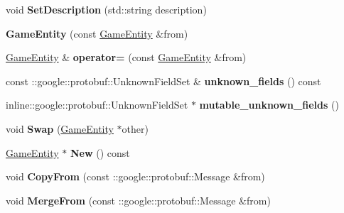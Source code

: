 \begin{DoxyCompactItemize}
\item 
\hypertarget{class_game_entity_a163f5785614921a65aab161491d8c47c}{}void {\bfseries Set\+Description} (std\+::string description)\label{class_game_entity_a163f5785614921a65aab161491d8c47c}

\item 
\hypertarget{class_game_entity_a8be507b6f8e3393e76d59b87b8dd8ec1}{}{\bfseries Game\+Entity} (const \hyperlink{class_game_entity}{Game\+Entity} \&from)\label{class_game_entity_a8be507b6f8e3393e76d59b87b8dd8ec1}

\item 
\hypertarget{class_game_entity_a9e1d3cf472239c42d097d4a417128ec9}{}\hyperlink{class_game_entity}{Game\+Entity} \& {\bfseries operator=} (const \hyperlink{class_game_entity}{Game\+Entity} \&from)\label{class_game_entity_a9e1d3cf472239c42d097d4a417128ec9}

\item 
\hypertarget{class_game_entity_a3d934514629d13e5eb05ba46db415616}{}const \+::google\+::protobuf\+::\+Unknown\+Field\+Set \& {\bfseries unknown\+\_\+fields} () const \label{class_game_entity_a3d934514629d13e5eb05ba46db415616}

\item 
\hypertarget{class_game_entity_a7ce79ef8a2b5fb69b8cf8fac2aa15a56}{}inline\+::google\+::protobuf\+::\+Unknown\+Field\+Set $\ast$ {\bfseries mutable\+\_\+unknown\+\_\+fields} ()\label{class_game_entity_a7ce79ef8a2b5fb69b8cf8fac2aa15a56}

\item 
\hypertarget{class_game_entity_aecf0195208966d0057722ccd68d054d5}{}void {\bfseries Swap} (\hyperlink{class_game_entity}{Game\+Entity} $\ast$other)\label{class_game_entity_aecf0195208966d0057722ccd68d054d5}

\item 
\hypertarget{class_game_entity_a5bfc2ef83277f013f48ccdbc91ed3939}{}\hyperlink{class_game_entity}{Game\+Entity} $\ast$ {\bfseries New} () const \label{class_game_entity_a5bfc2ef83277f013f48ccdbc91ed3939}

\item 
\hypertarget{class_game_entity_ad564106c4c0219fdaae20cc89a1f9eab}{}void {\bfseries Copy\+From} (const \+::google\+::protobuf\+::\+Message \&from)\label{class_game_entity_ad564106c4c0219fdaae20cc89a1f9eab}

\item 
\hypertarget{class_game_entity_ad962a6322eab070b8237fdf225601483}{}void {\bfseries Merge\+From} (const \+::google\+::protobuf\+::\+Message \&from)\label{class_game_entity_ad962a6322eab070b8237fdf225601483}


\end{DoxyCompactItemize}
